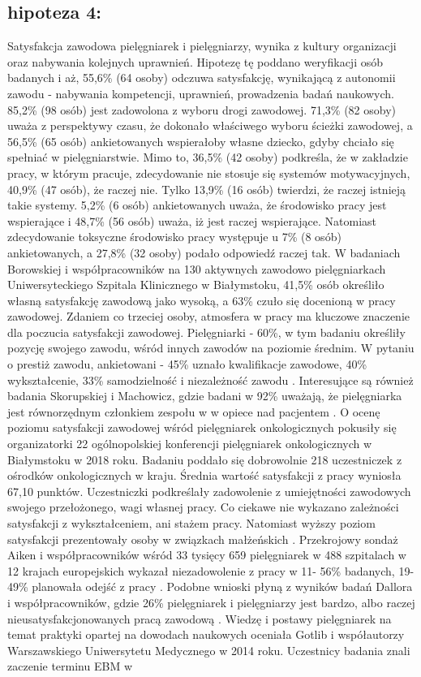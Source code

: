 \documentclass[a4paper,12pt,twoside,openright]{mwrep}
\begin{document}
\subsection*{hipoteza 4:} 
Satysfakcja zawodowa pielęgniarek i pielęgniarzy, wynika z kultury organizacji oraz nabywania kolejnych uprawnień. Hipotezę tę poddano weryfikacji osób badanych i aż, 55,6\%  (64 osoby) odczuwa satysfakcję, wynikającą z autonomii zawodu - nabywania kompetencji, uprawnień, prowadzenia badań naukowych.   85,2\% (98 osób) jest zadowolona z wyboru drogi zawodowej. 71,3\% (82 osoby) uważa z perspektywy czasu, że dokonało właściwego wyboru ścieżki zawodowej, a 56,5\% (65 osób) ankietowanych wspierałoby własne dziecko, gdyby chciało się spełniać w pielęgniarstwie. Mimo to, 36,5\% (42 osoby) podkreśla, że w zakładzie pracy, w którym pracuje,   zdecydowanie nie stosuje się systemów motywacyjnych, 40,9\% (47 osób), że raczej nie. Tylko 13,9\% (16 osób) twierdzi, że raczej istnieją takie systemy. 5,2\% (6 osób) ankietowanych uważa, że środowisko pracy jest wspierające i 48,7\%  (56 osób)  uważa, iż jest raczej wspierające. Natomiast zdecydowanie toksyczne środowisko pracy występuje u 7\% (8 osób) ankietowanych, a 27,8\%  (32 osoby) podało odpowiedź raczej tak. W badaniach  Borowskiej i współpracowników na 130 aktywnych zawodowo pielęgniarkach Uniwersyteckiego Szpitala Klinicznego w Białymstoku, 41,5\% osób określiło własną satysfakcję zawodową jako wysoką, a 63\% czuło się docenioną w pracy zawodowej. Zdaniem co trzeciej osoby, atmosfera w pracy ma kluczowe znaczenie dla poczucia satysfakcji zawodowej. Pielęgniarki - 60\%, w tym badaniu określiły  pozycję swojego zawodu, wśród innych zawodów na poziomie średnim. W pytaniu o prestiż zawodu, ankietowani - 45\% uznało kwalifikacje zawodowe, 40\% wykształcenie, 33\% samodzielność i niezależność zawodu \cite{zbiorowa}. Interesujące są również badania Skorupskiej  i Machowicz, gdzie badani w 92\% uważają, że pielęgniarka jest równorzędnym członkiem zespołu w w opiece nad pacjentem \cite{skorupska}. O ocenę poziomu satysfakcji zawodowej wśród pielęgniarek onkologicznych pokusiły się organizatorki 22 ogólnopolskiej konferencji pielęgniarek onkologicznych w Białymstoku w 2018 roku. Badaniu poddało się dobrowolnie 218 uczestniczek z ośrodków onkologicznych w kraju. Średnia wartość satysfakcji z pracy wyniosła 67,10 punktów. Uczestniczki podkreślały zadowolenie z umiejętności zawodowych swojego przełożonego, wagi własnej pracy. Co ciekawe nie wykazano zależności satysfakcji z wykształceniem, ani stażem pracy. Natomiast wyższy poziom satysfakcji prezentowały osoby w związkach małżeńskich \cite{onkologiczne}. Przekrojowy sondaż Aiken i współpracowników wśród  33 tysięcy 659 pielęgniarek w 488 szpitalach w 12 krajach europejskich wykazał niezadowolenie z pracy  w 11- 56\% badanych, 19-49\% planowała odejść z pracy \cite{termedia}. Podobne wnioski płyną z wyników badań Dallora  i współpracowników, gdzie 26\% pielęgniarek i pielęgniarzy jest bardzo, albo raczej nieusatysfakcjonowanych pracą zawodową \cite{dalora}. Wiedzę i postawy pielęgniarek na temat praktyki opartej na dowodach naukowych oceniała Gotlib i współautorzy Warszawskiego Uniwersytetu Medycznego w 2014 roku. Uczestnicy badania znali zaczenie terminu EBM w 
\end{document}
